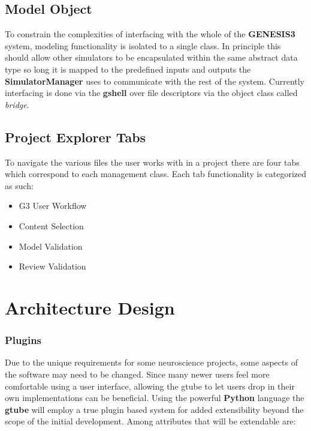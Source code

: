 \documentclass[12pt]{article}
\begin{document}
\subsection*{Model Object}

	To constrain the complexities of interfacing with the whole of the {\bf GENESIS3} system, modeling functionality is isolated to a single class. In principle this should allow other simulators to be encapsulated within the same abstract data type so long it is mapped to the predefined inputs and outputs the {\bf SimulatorManager} uses to communicate with the rest of the system.
	Currently interfacing is done via the {\bf gshell} over file descriptors via the object class called {\it bridge}. 
	
\subsection*{Project Explorer Tabs}

	To navigate the various files the user works with in a project there are four tabs which correspond to each management class. Each tab functionality is categorized as such:
	
\begin{itemize}
\item[] G3 User Workflow
\item[] Content Selection
\item[] Model Validation
\item[] Review Validation
\end{itemize}


\section*{Architecture Design}

\subsubsection*{Plugins}

Due to the unique requirements for some neuroscience projects, some aspects of the software may need to be changed. Since many newer users feel more comfortable using a user interface, allowing the gtube to let users drop in their own implementations can be beneficial. Using the powerful {\bf Python} language the {\bf gtube} will employ a true plugin based system for added extensibility beyond the scope of the initial development. Among attributes that will be extendable are:
\end{document}

